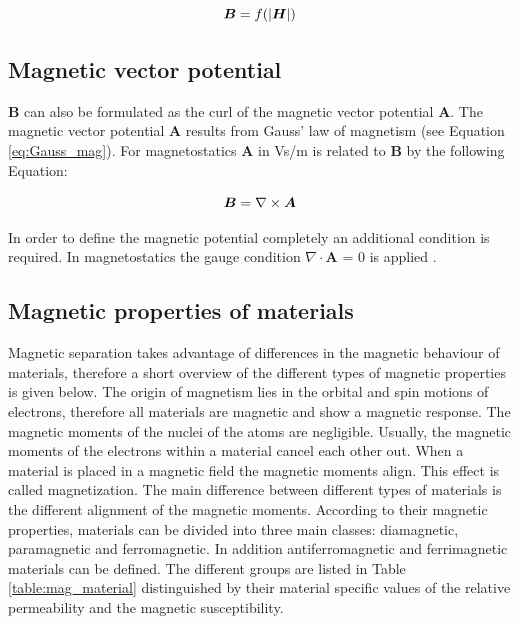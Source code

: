 \begin{equation}
\label{eq:nonlin_B}
\centering
\boldsymbol{B} = f(\vert\boldsymbol{H}\vert)
\end{equation}

\subsection{Magnetic vector potential}
\label{subsec:Mag_pot}

$\boldsymbol{B}$ can also be formulated as the curl of the magnetic vector potential $\boldsymbol{A}$. The magnetic vector potential $\boldsymbol{A}$ results from Gauss' law of magnetism (see Equation \ref{eq:Gauss_mag}). For magnetostatics $\boldsymbol{A}$ in Vs/m is related to $\boldsymbol{B}$ by the following Equation:  

\begin{equation}
\label{eq:Pot_A}
\centering
\boldsymbol{B} = \nabla\times\boldsymbol{A}
\end{equation}

In order to define the magnetic potential completely an additional condition is required. In magnetostatics the gauge condition $\nabla\cdotp\boldsymbol{A}$ = 0 is applied \cite{schwab2013begriffswelt}.   

\subsection{Magnetic properties of materials}
\label{subsec:Mag_mat}



Magnetic separation takes advantage of differences in the magnetic behaviour of materials, therefore a short overview of the different types of magnetic properties is given below. The origin of magnetism lies in the orbital and spin motions of electrons, therefore all materials are magnetic and show a magnetic response. The magnetic moments of the nuclei of the atoms are negligible. Usually,  the magnetic moments of the electrons within a material cancel each other out. When a material is placed in a magnetic field the magnetic moments align. This effect is called magnetization. The main difference between different types of materials is the different alignment of the magnetic moments. According to their magnetic properties, materials can be divided into three main classes: diamagnetic, paramagnetic and ferromagnetic. In addition antiferromagnetic and ferrimagnetic materials can be defined. The different groups are listed in Table \ref{table:mag_material} distinguished by their material specific values of the relative permeability and the magnetic susceptibility. 

